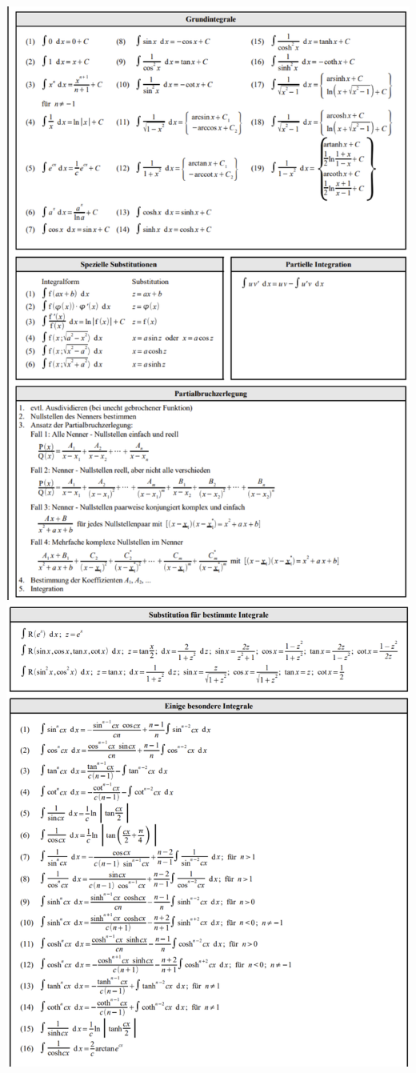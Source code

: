 \includegraphics[width=\columnwidth]{./images/int1.png}
\includegraphics[width=\columnwidth]{./images/int2.png}
